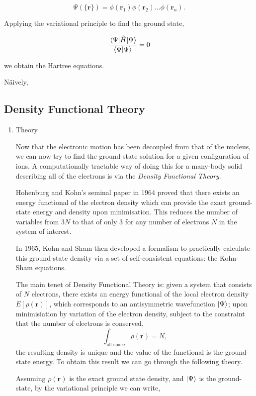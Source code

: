 \documentclass[a4paper,12pt,oneside,print,numbered,index,PageStyleIII]{PhDThesisPSnPDF}
\begin{document}
\[ \Psi_{}(\{\mathbf{r}\}) = \phi(\mathbf{r}_1)\phi(\mathbf{r}_2)\ldots \phi(\mathbf{r}_n). \]

Applying the variational principle to find the ground state,

\[ \frac{ \expval{ \hat{H} }{ \Psi }}{ \bra{\Psi}\ket{\Psi} } = 0 \]

we obtain the Hartree equations.



Näively,

\subsection{Density Functional Theory}
\label{sec:orgb280513}

\begin{enumerate}
\item Theory
\label{sec:org3c400cf}

Now that the electronic motion has been decoupled from that of the nucleus, we can now try to
find the ground-state solution for a given configuration of ions. A computationally tractable
way of doing this for a many-body solid describing all of the electrons is via the \emph{Density
Functional Theory}.

Hohenburg and Kohn's seminal paper in 1964 proved that there exists an energy functional of the
electron density which can provide the exact ground-state energy and density upon
minimisation. This reduces the number of variables from \(3N\) to that of only 3 for any number
of electrons \(N\) in the system of interest.

In 1965, Kohn and Sham then developed a formalism to practically calculate this ground-state density via
a set of self-consistent equations: the Kohn-Sham equations.

The main tenet of Density Functional Theory is: given a system that consists of \(N\) electrons,
there exists an energy functional of the local electron density \(E[\rho(\mathbf{r})]\), which
corresponds to an antisymmetric wavefunction \(\ket{\Psi}\); upon minimisiation by
variation of the electron density, subject to the constraint that the number of electrons is
conserved, \[ \int_{\text{all space}} \rho(\mathbf{r}) = N, \] the resulting density is unique
and the value of the functional is the ground-state energy. To obtain this result we can go
through the following theory.

Assuming \(\rho(\mathbf{r})\) is the exact ground state density, and \(\ket{\Psi}\)
is the ground-state, by the variational principle we can write,


\end{enumerate}
\end{document}
